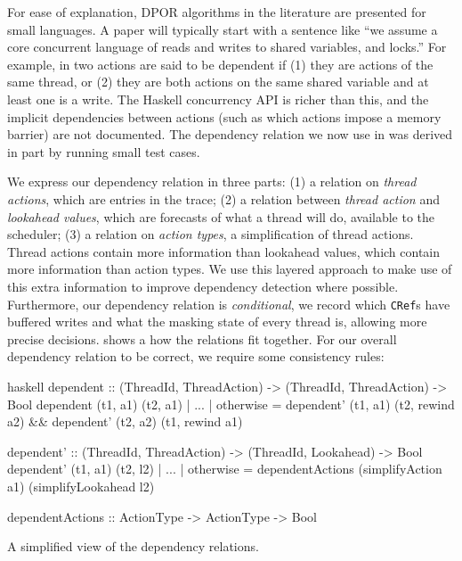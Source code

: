 For ease of explanation, DPOR algorithms in the literature are
presented for small languages.  A paper will typically start with a
sentence like ``we assume a core concurrent language of reads and
writes to shared variables, and locks.''  For example, in
\cite{coons2013} two actions are said to be dependent if (1) they are
actions of the same thread, or (2) they are both actions on the same
shared variable and at least one is a write.  The Haskell concurrency
API is richer than this, and the implicit dependencies between actions
(such as which actions impose a memory barrier) are not documented.
The dependency relation we now use in \dejafu{} was derived in part by
running small test cases.

We express our dependency relation in three parts: (1) a relation on
\emph{thread actions}, which are entries in the trace; (2) a relation
between \emph{thread action} and \emph{lookahead values}, which are
forecasts of what a thread will do, available to the scheduler; (3) a
relation on \emph{action types}, a simplification of thread actions.
Thread actions contain more information than lookahead values, which
contain more information than action types.  We use this layered
approach to make use of this extra information to improve dependency
detection where possible.  Furthermore, our dependency relation is
\emph{conditional}\cite{godefroid1993}, we record which \verb|CRef|s
have buffered writes and what the masking state of every thread is,
allowing more precise decisions.   shows a how
the relations fit together.  For our overall dependency relation to be
correct, we require some consistency rules:

\begin{listing}
\centering
\begin{cminted}{haskell}
dependent :: (ThreadId, ThreadAction) -> (ThreadId, ThreadAction) -> Bool
dependent (t1, a1) (t2, a1)
  | ...
  | otherwise = dependent' (t1, a1) (t2, rewind a2) &&
                dependent' (t2, a2) (t1, rewind a1)

dependent' :: (ThreadId, ThreadAction) -> (ThreadId, Lookahead) -> Bool
dependent' (t1, a1) (t2, l2)
  | ...
  | otherwise = dependentActions (simplifyAction    a1)
                                 (simplifyLookahead l2)

dependentActions :: ActionType -> ActionType -> Bool
\end{cminted}
\caption{A simplified view of the \dejafu{} dependency relations.}\label{lst:deprel-simp}
\end{listing}

